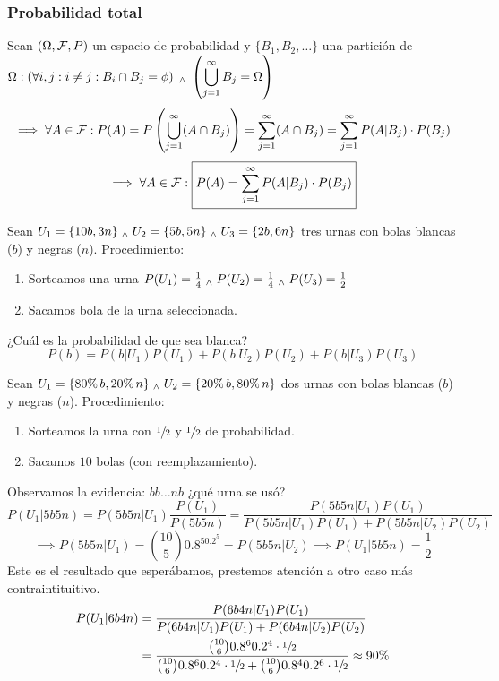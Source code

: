 \subsubsection{Probabilidad total}
\begin{prop}
	Sean $(\Omega, \mathcal{F}, P)$ un espacio de probabilidad y $\{B_1, B_2, \dots\}$ una partición de $\displaystyle \Omega : \left(\forall i, j :  i\ne j : B_i\cap B_j = \phi\right) \; _{\wedge} \; \left(\bigcup_{j=1}^\infty B_j=\Omega\right)$
	\[\implies \forall A \in \mathcal{F} : P(A)=P\left(\bigcup_{j=1}^\infty(A\cap B_j)\right)=\sum_{j=1}^\infty(A\cap B_j)=\sum_{j=1}^\infty P(A|B_j)\cdot P(B_j)\]
	\[\implies \forall A \in \mathcal{F} : \boxed{P(A) = \sum_{j=1}^\infty P(A|B_j)\cdot P(B_j)}\]
	\hfill \qedsymbol
\end{prop}
\begin{ejem}
	Sean $U_1=\{10b, 3n\} \; _{\wedge} \; U_2=\{5b, 5n\} \; _{\wedge} \; U_3=\{2b, 6n\}$ tres urnas con bolas blancas ($b$) y negras ($n$). Procedimiento:
	\begin{enumerate}[topsep=1pt, itemsep=1pt,parsep=3pt]
		\item Sorteamos una urna $P(U_1)=\frac{1}{4} \; _{\wedge} \; P(U_2)=\frac{1}{4} \; _{\wedge} \; P(U_3) = \frac{1}{2}$
		\item Sacamos bola de la urna seleccionada.
	\end{enumerate}
	¿Cuál es la probabilidad de que sea blanca?
	\[P(b)=P(b|U_1)P(U_1)+P(b|U_2)P(U_2)+P(b|U_3)P(U_3)\]
\end{ejem}

\begin{ejem}
	Sean $U_1=\{80\%\,b, 20\%\,n\} \; _{\wedge} \; U_2=\{20\%\,b, 80\%\,n\}$ dos urnas con bolas blancas ($b$) y negras ($n$). Procedimiento:
	\begin{enumerate}[topsep=1pt, itemsep=1pt,parsep=3pt]
		\item Sorteamos la urna con $\sfrac{1}{2}$ y $\sfrac{1}{2}$ de probabilidad.
		\item Sacamos $10$ bolas (con reemplazamiento).
	\end{enumerate}
	Observamos la evidencia: $bb\dots nb$ ¿qué urna se usó?
	\[P(U_1|5b5n)=P(5b5n|U_1)\frac{P(U_1)}{P(5b5n)}=\frac{P(5b5n|U_1)P(U_1)}{P(5b5n|U_1)P(U_1)+P(5b5n|U_2)P(U_2)}\]
	\[\implies P(5b5n|U_1)=\binom{10}{5}0.8^50.2^5=P(5b5n|U_2) \implies P(U_1|5b5n)=\frac{1}{2}\]
	Este es el resultado que esperábamos, prestemos atención a otro caso más contraintituitivo.
	\[\begin{aligned}
			P(U_1|6b4n) & = \frac{P(6b4n|U_1)P(U_1)}{P(6b4n|U_1)P(U_1)+P(6b4n|U_2)P(U_2)}                                                                                   \\
			            & = \frac{\binom{10}{6}0.8^60.2^4\cdot\sfrac{1}{2}}{\binom{10}{6}0.8^60.2^4\cdot\sfrac{1}{2} + \binom{10}{6}0.8^40.2^6\cdot\sfrac{1}{2}}\approx90\%
		\end{aligned}\]
\end{ejem}
\begin{figure}
	
\end{figure}

